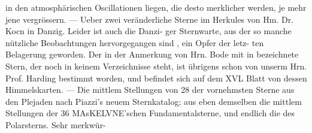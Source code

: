 \documentclass[12pt,a4paper]{article}
\begin{document}
in den atmosphärischen Oscillationen liegen, die desto merklicher werden, je mehr jene vergrössern. ---\newline
Ueber zwei veränderliche Sterne im Herkules von Hm. Dr. Kocn in Danzig. Leider ist auch die Danzi-\newline
ger Sternwarte, aus der so manche nützliche Beobachtungen hervorgegangen sind , ein Opfer der letz-\newline
ten Belagerung geworden. Der in der Anmerkung von Hrn. Bode mit in bezeichnete Stern, der noch\newline
in keinem Verzeichnisse steht, ist übrigens schon von unserm Hrn. Prof. Harding bestimmt worden, und\newline
befindet sich auf dem XVL Blatt von dessen Himmelskarten. --- Die mittlem Stellungen von 28 der\newline
vornehmsten Sterne aus den Plejaden nach Piazzi's neuem Sternkatalog; aus eben demselben die mittlem\newline
Stellungen der 36 MAsKELVNE'schen Fundamentalsterne, und endlich die des Polarsterns. Sehr merkwür-\newline
\end{document}
